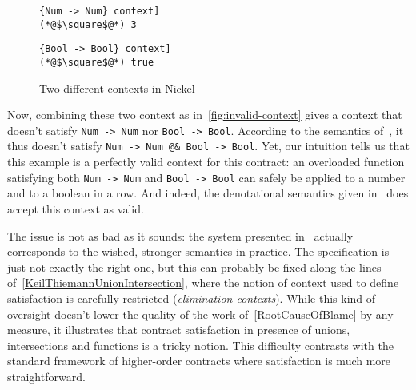 \documentclass[sigplan,10pt,review,anonymous]{acmart}
\newcommand{\nickel}[1]{\lstinline[language=nickel]{#1}}
\begin{document}
\begin{figure}[h]
\begin{lstlisting}[language=nickel, title=\nickel{Num -> Num} context]
(*@$\square$@*) 3
\end{lstlisting}
\begin{lstlisting}[language=nickel, title=\nickel{Bool -> Bool} context]
(*@$\square$@*) true
\end{lstlisting}
\caption{Two different contexts in Nickel}
\label{fig:valid-contexts}
\end{figure}

Now, combining these two context as in~\ref{fig:invalid-context} gives a context
that doesn't satisfy \nickel{Num -> Num} nor \nickel{Bool -> Bool}.  According
to the semantics of~\cite{RootCauseOfBlame}, it thus doesn't satisfy \nickel{Num
-> Num @& Bool -> Bool}. Yet, our intuition tells us that this example is a
perfectly valid context for this contract: an overloaded function satisfying
both \nickel{Num -> Num} and \nickel{Bool -> Bool} can safely be applied to a
number and to a boolean in a row. And indeed, the denotational semantics given
in~\cite{KeilThiemannUnionIntersection} does accept this context as valid.

The issue is not as bad as it sounds: the system presented
in~\cite{RootCauseOfBlame} actually corresponds to the wished, stronger
semantics in practice. The specification is just not exactly the right one, but
this can probably be fixed along the lines
of~\ref{KeilThiemannUnionIntersection}, where the notion of context used to
define satisfaction is carefully restricted (\emph{elimination contexts}). While
this kind of oversight doesn't lower the quality of the work
of~\ref{RootCauseOfBlame} by any measure, it illustrates that contract
satisfaction in presence of unions, intersections and functions is a tricky
notion. This difficulty contrasts with the standard framework of higher-order
contracts where satisfaction is much more straightforward.
\end{document}
